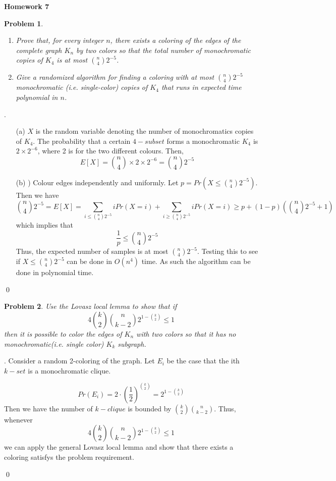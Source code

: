 \documentclass[12pt]{article}
\date{Feb 14, 2012}
\newtheorem{hw}{Problem}
\newenvironment{sol}
  {\par\vspace{3mm}\noindent{\it Solution}.}
  {\qed}
\begin{document}
\begin{center}
{\LARGE\bf Homework 7}\\
\vspace{2mm}
\end{center}

\begin{hw}
\begin{enumerate}
  \item Prove that, for every integer $n$, there exists a coloring of the edges of the complete graph $K_n$ by two colors so that the total number of monochromatic copies of $K_4$ is at most ${n\choose 4}2^{-5}$.
  \item Give a randomized algorithm for finding a coloring with at most ${n \choose 4}2^{-5}$ monochromatic (i.e. single-color) copies of $K_4$ that runs in expected time polynomial in $n$.
\end{enumerate}
\end{hw}

\begin{sol}
\renewcommand{\qedsymbol}{}
\begin{itemize}
\item [(a)] $X$ is the random variable denoting the number of monochromatics copies of $K_4$. The probability that a certain $4-subset$ forms a monochromatic $K_4$ is $2\times 2^{-6}$, where 2 is for the two different colours. Then, $$E[X]=
{n\choose 4} \times 2\times 2^ { -6} = {n\choose 4}2^{-5}$$
\item [(b)] ) Colour edges independently and uniformly. Let $p = Pr(X\leq {n\choose 4}2^{-5})$. Then we have
$${n\choose 4}2^{-5} = E[X] = \sum_{i \leq {n\choose 4}2^{-5}}{iPr(X=i)} + \sum_{i \geq {n\choose 4}2^{-5}}{iPr(X=i)} \geq p + (1-p)({n\choose 4}2^{-5}+1)$$ which implies that $$\frac{1}{p} \leq {n\choose 4}2^{-5}$$
Thus, the expected number of samples is at most ${n\choose 4}2^{-5}$. Testing this to see if $X \leq {n\choose 4}2^{-5}$ can be done in $O(n^4)$ time. As such the algorithm can be done in polynomial time.
\end{itemize}
\end{sol}


\begin{hw}
Use the Lovasz local lemma to show that if \[4 {k \choose 2} {n \choose {k-2}}2^{1-{k\choose 2}}\leq 1\]
then it is possible to color the edges of $K_n$ with two colors so that it has no monochromatic(i.e. single color) $K_k$ subgraph.
\end{hw}

\begin{sol}
\renewcommand{\qedsymbol}{}
Consider a random 2-coloring of the graph.
Let $E_i$ be the case that the ith $k-set$ is a monochromatic clique.

$$Pr(E_i)=2\cdot (\frac{1}{2})^{k\choose 2}=2^{1-{k\choose 2}}$$
Then we have the number of $k-clique$ is bounded by ${k \choose 2} {n \choose {k-2}}$.
Thus, whenever 
$$4 {k \choose 2} {n \choose {k-2}}2^{1-{k\choose 2}}\leq 1$$
we can apply the general Lovasz local lemma and show that there exists a coloring satisfys the problem requirement.

\end{sol}
\end{document}
